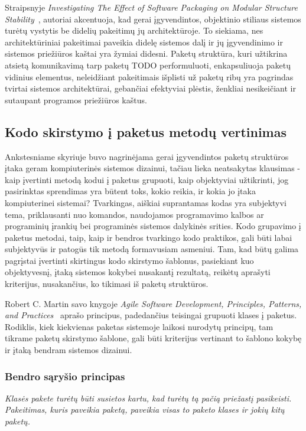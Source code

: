 Straipsnyje \textit{Investigating The Effect of Software Packaging on Modular Structure Stability}~\cite{ModularStability}, autoriai akcentuoja, kad
gerai įgyvendintos, objektinio stiliaus sistemos turėtų vystytis be didelių pakeitimų jų architektūroje.
To siekiama, nes architektūriniai pakeitimai paveikia didelę sistemos dalį ir
jų įgyvendinimo ir sistemos priežiūros kaštai yra žymiai didesni\cite{ModularStability}.
Paketų struktūra, kuri užtikrina atsietą  komunikavimą tarp paketų TODO performuluoti, enkapsuliuoja paketų vidinius elementus, neleidžiant pakeitimais
išplisti už paketų ribų yra pagrindas tvirtai sistemos architektūrai, gebančiai efektyviai plėstis, ženkliai nesikeičiant ir sutaupant programos priežiūros kaštus.

\subsection{Kodo skirstymo į paketus metodų vertinimas}
Ankstesniame skyriuje buvo nagrinėjama gerai įgyvendintos paketų struktūros įtaka geram kompiuterinės sistemos dizainui,
tačiau lieka neatsakytas klausimas - kaip įvertinti metodą kodui į paketus grupuoti, kaip objektyviai užtikrinti,
jog pasirinktas sprendimas yra būtent toks, kokio reikia, ir kokia jo įtaka kompiuterinei sistemai?
Tvarkingas, aiškiai suprantamas kodas yra subjektyvi tema, priklausanti nuo komandos,
naudojamos programavimo kalbos ar programinių įrankių bei programinės sistemos dalykinės srities.
Kodo grupavimo į paketus metodai, taip, kaip ir bendros tvarkingo kodo praktikos,
gali būti labai subjektyvūs ir patogūs tik metodą formavusiam asmeniui.
Tam, kad būtų galima pagrįstai įvertinti skirtingus kodo skirstymo šablonus, pasiekiant kuo objektyvesnį,
įtaką sistemos kokybei nusakantį rezultatą, reikėtų aprašyti kriterijus, nusakančius, ko tikimasi iš paketų struktūros.

Robert C. Martin savo knygoje \textit{Agile Software Development, Principles, Patterns, and Practices}~\cite{AgileSoftwareDevelopment} aprašo
principus, padedančius teisingai grupuoti klases į paketus.
Rodiklis, kiek kiekvienas paketas sistemoje laikosi nurodytų principų, tam tikrame paketų skirstymo šablone, gali
būti kriterijus vertinant to šablono kokybę ir įtaką bendram sistemos dizainui.

\subsubsection{Bendro sąryšio principas}
\textit{Klasės pakete turėtų būti susietos kartu, kad turėtų tą pačią priežastį pasikeisti. Pakeitimas,
kuris paveikia paketą, paveikia visas to paketo klases ir jokių kitų paketų.}

